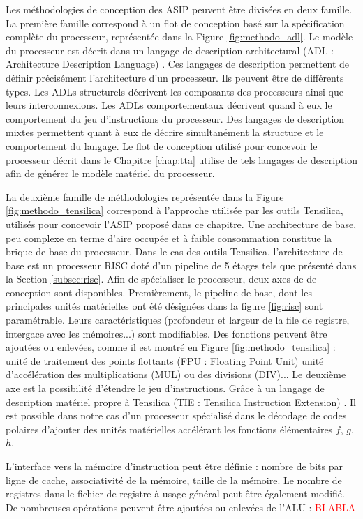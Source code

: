 Les méthodologies de conception des ASIP peuvent être divisées en deux famille. La première famille correspond à un flot de conception basé sur la spécification complète du processeur, représentée dans la Figure \ref{fig:methodo_adl}. Le modèle du processeur est décrit dans un langage de description architectural (ADL : Architecture Description Language) \cite{mishra2011processor}. Ces langages de description permettent de définir précisément l'architecture d'un processeur. Ils peuvent être de différents types. Les ADLs structurels décrivent les composants des processeurs ainsi que leurs interconnexions. Les ADLs comportementaux décrivent quand à eux le comportement du jeu d'instructions du processeur. Des langages de description mixtes permettent quant à eux de décrire simultanément la structure et le comportement du langage. Le flot de conception utilisé pour concevoir le processeur décrit dans le Chapitre \ref{chap:tta} utilise de tels langages de description afin de générer le modèle matériel du processeur.


La deuxième famille de méthodologies représentée dans la Figure \ref{fig:methodo_tensilica} correspond à l'approche utilisée par les outils Tensilica, utilisés pour concevoir l'ASIP proposé dans ce chapitre. Une architecture de base, peu complexe en terme d'aire occupée et à faible consommation constitue la brique de base du processeur. Dans le cas des outils Tensilica, l'architecture de base est un processeur RISC doté d'un pipeline de 5 étages tels que présenté dans la Section \ref{subsec:risc}. Afin de spécialiser le processeur, deux axes de de conception sont disponibles. Premièrement, le pipeline de base, dont les principales unités matérielles ont été désignées dans la figure \ref{fig:risc} sont paramétrable. Leurs caractéristiques (profondeur et largeur de la file de registre, intergace avec les mémoires...) sont modifiables. Des fonctions peuvent être ajoutées ou enlevées, comme il est montré en Figure \ref{fig:methodo_tensilica} : unité de traitement des points flottants (FPU : Floating Point Unit) unité d'accélération des multiplications (MUL) ou des divisions (DIV)... Le deuxième axe est la possibilité d'étendre le jeu d'instructions. Grâce à un langage de description matériel propre à Tensilica (TIE : Tensilica Instruction Extension) \cite{tie2017reference}. Il est possible dans notre cas d'un processeur spécialisé dans le décodage de codes polaires d'ajouter des unités matérielles accélérant les fonctions élémentaires $f$, $g$, $h$.

L'interface vers la mémoire d'instruction peut être définie : nombre de bits par ligne de cache, associativité de la mémoire, taille de la mémoire. Le nombre de registres dans le fichier de registre à usage général peut être également modifié. De nombreuses opérations peuvent être ajoutées ou enlevées de l'ALU : \textcolor{red}{BLABLA}



